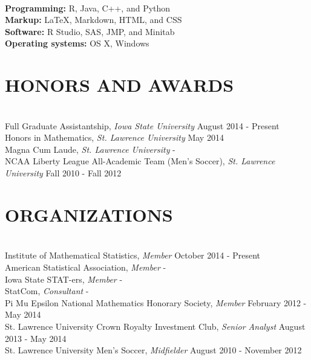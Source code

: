 \documentclass[10pt]{res} %
\begin{document}
\begin{resume}
\hrulefill \\
{\bf Programming:} R, Java, C++, and Python\\
{\bf Markup:} LaTeX, Markdown, HTML, and CSS\\
{\bf Software:} R Studio, SAS, JMP, and Minitab\\
{\bf Operating systems:} OS X, Windows


\section{HONORS AND AWARDS}

\hrulefill \\
Full Graduate Assistantship, {\sl Iowa State University} \hfill August 2014 - Present \\
Honors in Mathematics, {\sl St. Lawrence University} \hfill May 2014 \\
Magna Cum Laude, {\sl St. Lawrence University} \hfill - \\
NCAA Liberty League All-Academic Team (Men's Soccer), {\sl St. Lawrence University} \hfill Fall 2010 - Fall 2012


\section{ORGANIZATIONS}

\hrulefill \\
Institute of Mathematical Statistics, {\sl Member} \hfill October 2014 - Present \\
American Statistical Association, {\sl Member} \hfill - \\
Iowa State STAT-ers, {\sl Member} \hfill - \\
StatCom, {\sl Consultant} \hfill - \\
Pi Mu Epsilon National Mathematics Honorary Society, {\sl Member} \hfill February 2012 - May 2014 \\
St. Lawrence University Crown Royalty Investment Club, {\sl Senior Analyst} \hfill August 2013 - May 2014 \\
St. Lawrence University Men's Soccer, {\sl Midfielder} \hfill August 2010 - November 2012 


\end{resume}
\end{document}
